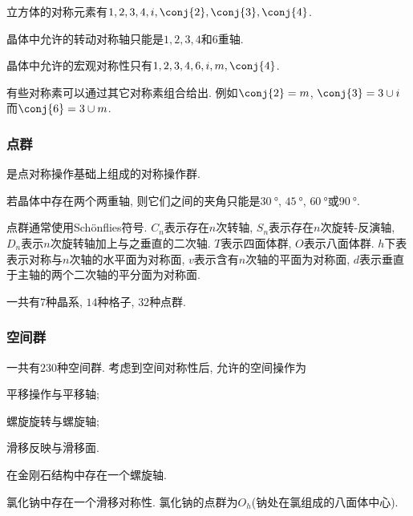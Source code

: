 \documentclass[hidelinks]{ctexart}
\begin{document}
\begin{sample}
    \begin{ex}
        立方体的对称元素有$1,2,3,4,i,\conj{2},\conj{3},\conj{4}$.
    \end{ex}
\end{sample}
\begin{theorem}
    晶体中允许的转动对称轴只能是$1,2,3,4$和$6$重轴.
\end{theorem}
\begin{theorem}
    晶体中允许的宏观对称性只有$1,2,3,4,6,i,m,\conj{4}$.
\end{theorem}
有些对称素可以通过其它对称素组合给出. 例如$\conj{2} = m$, $\conj{3} = 3\cup i$而$\conj{6}=3\cup m$.

\subsubsection{点群} %
\label{ssub:点群}

是点对称操作基础上组成的对称操作群.
\begin{ex}
    若晶体中存在两个两重轴, 则它们之间的夹角只能是$\SI{30}{\degree}$, $\SI{45}{\degree}$, $\SI{60}{\degree}$或$\SI{90}{\degree}$.
\end{ex}
点群通常使用Sch\"onflies符号. $C_n$表示存在$n$次转轴, $S_n$表示存在$n$次旋转-反演轴, $D_n$表示$n$次旋转轴加上与之垂直的二次轴. $T$表示四面体群, $O$表示八面体群. $h$下表表示对称与$n$次轴的水平面为对称面, $v$表示含有$n$次轴的平面为对称面, $d$表示垂直于主轴的两个二次轴的平分面为对称面.
\par
一共有$7$种晶系, $14$种格子, $32$种点群.


\subsubsection{空间群} %
\label{ssub:空间群}

一共有$230$种空间群. 考虑到空间对称性后, 允许的空间操作为
\begin{cenum}
    \item 平移操作与平移轴;
    \item 螺旋旋转与螺旋轴;
    \item 滑移反映与滑移面.
\end{cenum}
\begin{sample}
    \begin{ex}
        在金刚石结构中存在一个螺旋轴.
    \end{ex}
\end{sample}
\begin{sample}
    \begin{ex}
        氯化钠中存在一个滑移对称性. 氯化钠的点群为$O_h$(钠处在氯组成的八面体中心).
    \end{ex}
\end{sample}
\end{document}
